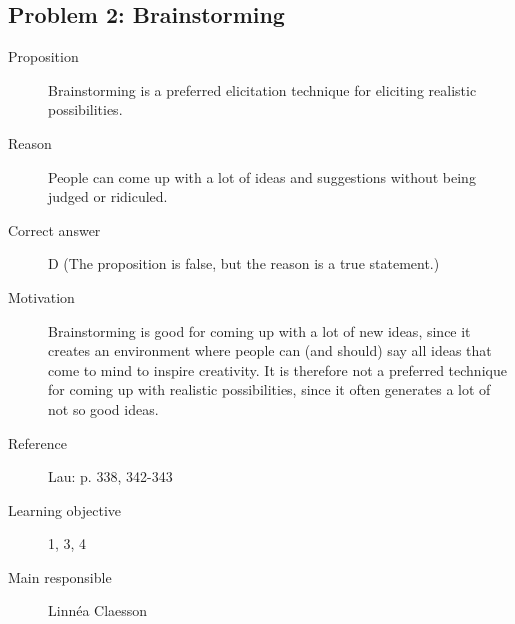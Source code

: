\documentclass[10pt,a4paper]{article}
\begin{document}
\subsection*{Problem 2: Brainstorming}
\begin{description}
\item[Proposition] Brainstorming is a preferred elicitation technique for eliciting realistic possibilities.
\item[Reason] People can come up with a lot of ideas and suggestions without being judged or ridiculed.
\item[Correct answer] D (The proposition is false, but the reason is a true statement.)
\item[Motivation] Brainstorming is good for coming up with a lot of new ideas, since it creates an environment where people can (and should) say all ideas that come to mind to inspire creativity. It is therefore not a preferred technique for coming up with realistic possibilities, since it often generates a lot of not so good ideas.
\item[Reference] Lau: p. 338, 342-343
\item[Learning objective] 1, 3, 4
\item[Main responsible] Linnéa Claesson
\end{description}
\end{document}
